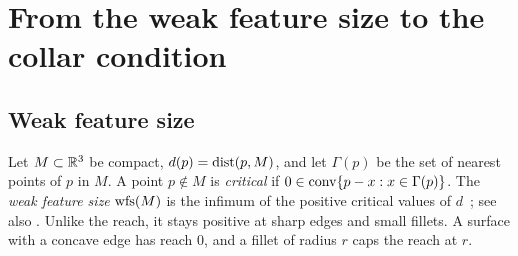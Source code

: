 \section{From the weak feature size to the collar condition}\label{sec:collar}

\subsection{Weak feature size}
Let $M\subset\mathbb{R}^3$ be compact, $d(p)=\operatorname{dist}(p,M)$, and let $\Gamma(p)$ be the set of nearest points of $p$ in $M$.
A point $p\notin M$ is \emph{critical} if $0\in\operatorname{conv}\{p-x:x\in\Gamma(p)\}$. The \emph{weak feature size}
$\operatorname{wfs}(M)$ is the infimum of the positive critical values of $d$~\cite[\S2.2]{CCSL09dcg}; see also
\cite{ChazalLieutier07}. Unlike the reach, it
stays positive at sharp edges and small fillets. A surface with a concave edge has reach $0$, and a fillet of
radius $r$ caps the reach at $r$.

